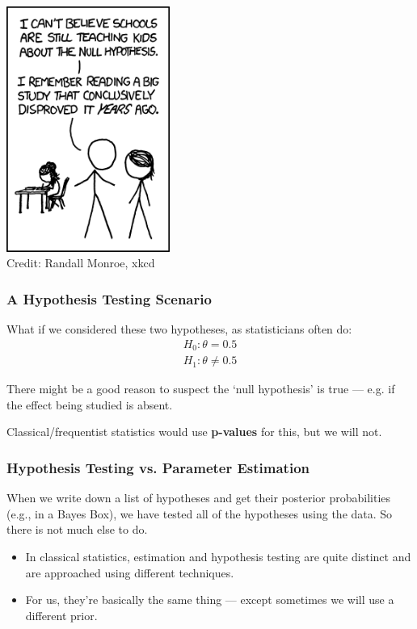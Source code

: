 \documentclass{beamer}
\begin{document}
\begin{frame}
\begin{center}
\includegraphics[width=0.4\textwidth]{images/null_hypothesis.png} \\
Credit: Randall Monroe, xkcd
\end{center}

\end{frame}


\begin{frame}
\frametitle{A Hypothesis Testing Scenario}
What if we considered these two hypotheses, as statisticians often do:
\begin{align}
H_0: \theta = 0.5 \\
H_1: \theta \neq 0.5
\end{align}
\pause

There might be a good reason to suspect the `null hypothesis' is true ---
e.g. if the effect being studied is absent.\pause

Classical/frequentist statistics would use {\bf p-values} for this, but we
will not.
\end{frame}


\begin{frame}
\frametitle{Hypothesis Testing vs. Parameter Estimation}
When we write down a list of hypotheses and get their
posterior probabilities (e.g., in a Bayes Box), we have tested all of the
hypotheses using the data. So there is not much else to do.
\pause
\begin{itemize}
\item In classical statistics, estimation and hypothesis testing
are quite distinct and are approached using different techniques.\pause
\item For us, they're basically the same thing --- except sometimes we will use a
different prior.
\end{itemize}

\end{frame}
\end{document}
